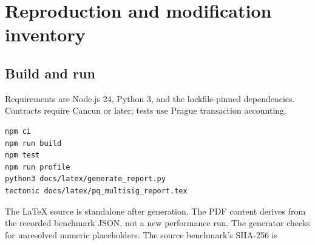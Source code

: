 \documentclass[11pt,a4paper]{article}
\begin{document}
\newpage
\section{Reproduction and modification inventory}
\subsection{Build and run}
Requirements are Node.js 24, Python 3, and the lockfile-pinned dependencies.
Contracts require Cancun or later; tests use Prague transaction accounting.
\begin{lstlisting}
npm ci
npm run build
npm test
npm run profile
python3 docs/latex/generate_report.py
tectonic docs/latex/pq_multisig_report.tex
\end{lstlisting}
The LaTeX source is standalone after generation. The PDF content derives from
the recorded benchmark JSON, not a new performance run. The generator checks
for unresolved numeric placeholders. The source benchmark's SHA-256 is
\begin{quote}\small{}\end{quote}
\end{document}

